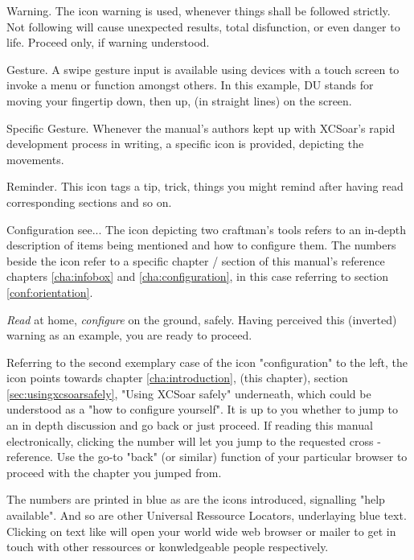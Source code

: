\warning Warning. The icon warning is used, whenever things shall be followed 
strictly.  Not following will cause unexpected results, total disfunction, or 
even danger to life. Proceed only, if warning understood.

 Gesture. A swipe gesture input is available using devices with a 
touch screen to invoke a menu or function amongst others. In this example, DU 
stands for moving your fingertip down, then up, (in straight lines) on the 
screen.
  
 Specific Gesture. Whenever the manual's authors kept up with XCSoar's rapid development process
in writing, a specific icon is provided, depicting the movements.

\tip Reminder. This icon tags a tip, trick, things you might remind after having read corresponding sections and so on.

 Configuration see... The icon depicting two craftman's 
tools refers to an in-depth description of items being mentioned and how to 
configure them. The numbers beside the icon refer to a specific chapter / 
section of this manual's reference chapters \ref{cha:infobox} and 
\ref{cha:configuration}, in this case referring to section 
\ref{conf:orientation}. 


\emph{Read} at home, \emph{configure} on the ground, safely. Having perceived 
this (inverted) warning as an example, you are ready to proceed.

 Referring to the second exemplary case of the icon 
"configuration" to the left, the icon points 
towards chapter \ref{cha:introduction}, (this chapter), section 
\ref{sec:usingxcsoarsafely}, "Using XCSoar safely" underneath, which could be 
understood as a "how to configure yourself". It is up to you whether to jump 
to an in depth discussion and go back or just proceed. If reading this manual 
electronically, clicking the number will let you jump to the requested cross
-reference.  Use the go-to "back" (or similar) function of your particular 
browser to proceed with the chapter you jumped from.

The numbers are printed in blue as are the icons introduced, signalling "help 
available". And so are other Universal Ressource Locators, underlaying blue 
text. Clicking on text like  will open your world wide 
web browser or mailer to get in touch with other ressources or konwledgeable 
people respectively.

